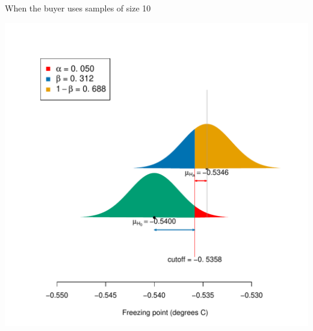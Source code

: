 \documentclass[10pt]{beamer}\usepackage[]{graphicx}\usepackage[]{color}
\makeatletter
\def\maxwidth{ %
  \ifdim\Gin@nat@width>\linewidth
    \linewidth
  \else
    \Gin@nat@width
  \fi
}
\newenvironment{knitrout}{}{} %
\makeatother
\begin{document}
\begin{frame}[fragile]{When the buyer uses samples of size 10}
\begin{knitrout}\tiny
{}\color{fgcolor}

{\centering \includegraphics[width=\maxwidth]{figure/unnamed-chunk-13-1} 

}


\end{knitrout}
\end{frame}
\end{document}
